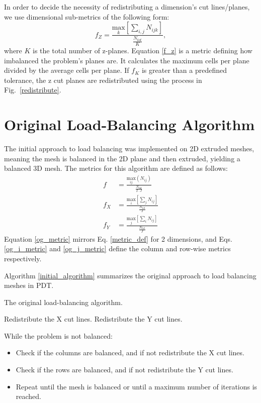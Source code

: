 In order to decide the necessity of redistributing a dimension's cut lines/planes, we use dimensional sub-metrics of the following form:
\begin{equation}
f_{Z} = \frac{\underset{k}{\text{max}}[\sum_{i,j} N_{ijk}]}{\frac{N_{tot}}{K}},
\label{f_z}
\end{equation}
where $K$ is the total number of z-planes.
Equation \ref{f_z} is a metric defining how imbalanced the problem's planes are. It calculates the maximum cells per plane divided by the average cells per plane. If $f_K$ is greater than a predefined tolerance, the z cut planes are redistributed using the process in Fig.~\ref{redistribute}.

\section{Original Load-Balancing Algorithm}
\label{sec:og_lb}

The initial approach to load balancing was implemented on 2D extruded meshes, meaning the mesh is balanced in the 2D plane and then extruded, yielding a balanced 3D mesh. The metrics for this algorithm are defined as follows:
\begin{align}
f &= \frac{\underset{ij}{\text{max}}(N_{ij})}{\frac{N_{tot}}{I\cdot J}}  \label{og_metric}\\
f_X &= \frac{\underset{i}{\text{max}}[\sum_{j} N_{ij}] } {\frac{N_{tot}}{I}} \label{og_i_metric} \\
f_Y &= \frac{\underset{j}{\text{max}}[\sum_{i} N_{ij}] } {\frac{N_{tot}}{J}} \label{og_j_metric}
\end{align}
Equation \ref{og_metric} mirrors Eq. \ref{metric_def} for 2 dimensions, and Eqs. \ref{og_i_metric} and \ref{og_j_metric} define the column and row-wise metrics respectively.

 Algorithm \ref{initial_algorithm} summarizes the original approach to load balancing meshes in PDT.
\begin{algorithm}[H]
\caption{The original load-balancing algorithm.}
\label{initial_algorithm}
\begin{algorithmic}

    \STATE Redistribute the X cut lines.
  \ENDIF
  	\STATE Redistribute the Y cut lines.
  \ENDIF
\ENDWHILE
\end{algorithmic}
\end{algorithm}
While the problem is not balanced:
\begin{itemize}
  \item Check if the columns are balanced, and if not redistribute the X cut lines.
  \item Check if the rows are balanced, and if not redistribute the Y cut lines.
  \item Repeat until the mesh is balanced or until a maximum number of iterations is reached.
\end{itemize}

